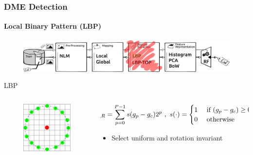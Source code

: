 \documentclass{beamer}
\begin{document}
\begin{frame}
  \frametitle{DME Detection}
  \framesubtitle{Local Binary Pattern (LBP)}
  \begin{figure}
    \centering
    \includegraphics[width=.5\textwidth]{./images/ml-fe1.png}
  \end{figure}
  \begin{block}{LBP}
    \begin{columns}
      \begin{column}{.4\linewidth}
        \begin{figure}
          \centering
          \includegraphics[width=.4\textwidth]{./images/lbp.png}
        \end{figure}
      \end{column}
      \begin{column}{.6\linewidth}
        {\tiny
          \begin{align*}\hspace*{-1cm}
            LBP_{P,R} = \sum_{p=0}^{P-1}s(g_{p} - g_{c})2^{p} \ ,~ s(\cdot) = \begin{cases}                                  
              1  & \ \text{if } (g_{p} - g_{c}) \geq 0\\                                                                         
              0  & \ \text{otherwise}\\                                                                                          
            \end{cases} \ ,                                                                                                        
          \end{align*}}%
        \begin{itemize}[leftmargin=*]\footnotesize
        \item Select uniform and rotation invariant
        \end{itemize}
      \end{column}
    \end{columns}
  \end{block}
\end{frame}
\end{document}
